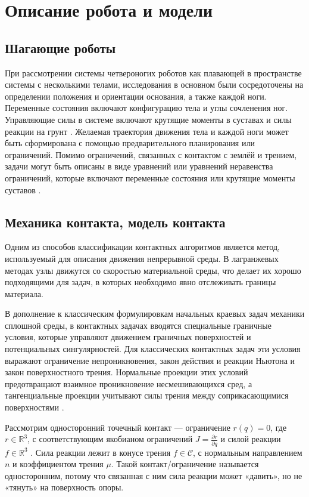 \chapter{Описание робота и модели}\label{ch:ch2}
\section{Шагающие роботы}\label{sec:ch2/sec1}
При рассмотрении системы четвероногих роботов как плавающей в пространстве системы с несколькими телами, исследования в основном были сосредоточены на определении положения и ориентации основания, а также каждой ноги. Переменные состояния включают конфигурацию тела и углы сочленения ног. Управляющие силы в системе включают крутящие моменты в суставах и силы реакции на грунт \cite{henze2016, farshidian2017robust}. Желаемая траектория движения тела и каждой ноги может быть сформирована с помощью предварительного планирования или ограничений. Помимо ограничений, связанных с контактом с землёй и трением, задачи могут быть описаны в виде уравнений или уравнений неравенства ограничений, которые включают переменные состояния или крутящие моменты суставов \cite{henze2017multi}. 

\section{Механика контакта, модель контакта}\label{sec:ch2/sect2}
Одним из способов классификации контактных алгоритмов является метод, используемый для описания движения непрерывной среды. В лагранжевых методах узлы движутся со скоростью материальной среды, что делает их хорошо подходящими для задач, в которых необходимо явно отслеживать границы материала. 

В дополнение к классическим формулировкам начальных краевых задач механики сплошной среды, в контактных задачах вводятся специальные граничные условия, которые управляют движением граничных поверхностей и потенциальных сингулярностей. Для классических контактных задач эти условия выражают ограничение непроникновения, закон действия и реакции Ньютона и закон поверхностного трения. Нормальные проекции этих условий предотвращают взаимное проникновение несмешивающихся сред, а тангенциальные проекции учитывают силы трения между соприкасающимися поверхностями \cite{Shamim2024}.

Рассмотрим односторонний точечный контакт --- ограничение ${r}({q}) = 0$, где ${r} \in \mathbb{R}^3$, с соответствующим якобианом ограничений ${J} = \frac{\partial {r}}{\partial {q}}$ и силой реакции ${f} \in \mathbb{R}^3$ \cite{Posa2014}.
%
Сила реакции лежит в конусе трения ${f} \in \mathcal{C}$, с нормальным направлением ${n}$ и коэффициентом трения $\mu$.
%
Такой контакт/ограничение называется односторонним, потому что связанная с ним сила реакции может «давить», но не «тянуть» на поверхность опоры.

